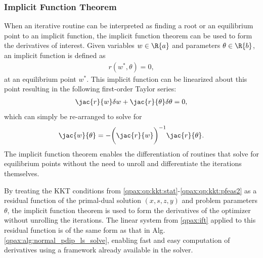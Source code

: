 \subsubsection{Implicit Function Theorem}
%
%
When an iterative routine can be interpreted as finding a root or an equilibrium point to an implicit function, the implicit function theorem can be used to form the derivatives of interest. Given variables $w \in \R{a}$ and parameters $\theta \in \R{b}$, an implicit function is defined as
\begin{align}
    r(w^*, \theta) = 0,
\end{align}
at an equilibrium point $w^*$. This implicit function can be linearized about this point resulting in the following first-order Taylor series:
\begin{align}
    \jac{r}{w} \delta w + \jac{r}{\theta} \delta \theta = 0 ,
\end{align}
which can simply be re-arranged to solve for
\begin{align}
    \jac{w}{\theta} = -\bigg(\jac{r}{w} \bigg)^{-1} \jac{r}{\theta}. \label{qpax:ift}
\end{align}
The implicit function theorem enables the differentiation of routines that solve for equilibrium points without the need to unroll and differentiate the iterations themselves. 

By treating the KKT conditions from \eqref{qpax:qp:kkt:stat}-\eqref{qpax:qp:kkt:pfeas2} as a residual function of the primal-dual solution $(x, s, z, y)$ and problem parameters $\theta$, the implicit function theorem is used to form the derivatives of the optimizer without unrolling the iterations. The linear system from \eqref{qpax:ift} applied to this residual function is of the same form as that in Alg. \eqref{qpax:alg:normal_pdip_ls_solve}, enabling fast and easy computation of derivatives using a framework already available in the solver.
%
%

